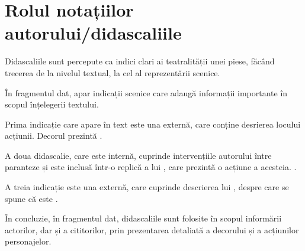 \section{Rolul notațiilor autorului/didascaliile}

Didascaliile sunt percepute ca indici clari ai teatralității unei piese, făcând trecerea de la nivelul textual, la cel al reprezentării scenice.

În fragmentul dat, apar  indicații scenice care adaugă informații importante în scopul înțelegerii textului.

Prima indicație care apare în text este una externă, care conține desrierea locului acțiunii. Decorul prezintă .

A doua didascalie, care este internă, cuprinde intervențiile autorului între paranteze și este inclusă într-o replică a lui , care prezintă o acțiune a acesteia. .

A treia indicație este una externă, care cuprinde descrierea lui , despre care se spune că este .

În concluzie, în fragmentul dat, didascaliile sunt folosite în scopul informării actorilor, dar și a cititorilor, prin prezentarea detaliată a decorului și a acțiunilor personajelor.
